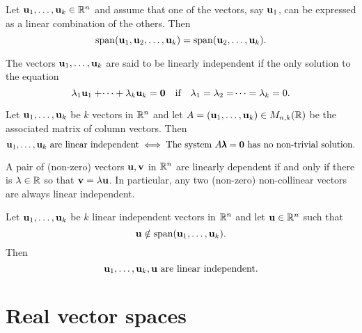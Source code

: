 \documentclass[10pt, a4paper]{article}
\begin{document}
\begin{lemma}
    Let $\mathbf{u}_1, \dotsc, \mathbf{u}_k \in \mathbb{R} ^ n$ and assume that one of the vectors,
    say $\mathbf{u}_1$,
    can be expressed as a linear combination of the others.
    Then
    \[
    \mathrm{span}(\mathbf{u}_1, \mathbf{u}_2, \dotsc, \mathbf{u}_k) = \mathrm{span}(\mathbf{u}_2, \dotsc, \mathbf{u}_k).
    \]
\end{lemma}

\begin{definition}
    The vectors $\mathbf{u}_1, \dotsc, \mathbf{u}_k$ are said to be linearly independent if the only solution to the equation
    \[
    \lambda_1\mathbf{u}_1 + \dotsi + \lambda_k\mathbf{u}_k = \mathbf{0}\quad\text{if}\quad\lambda_1 = \lambda_2 = \dotsi = \lambda_k = 0.
    \]
\end{definition}

\begin{corollary}
    Let $\mathbf{u}_1, \dotsc, \mathbf{u}_k$ be $k$ vectors in $\mathbb{R} ^ n$ and let $A = (\mathbf{u}_1, \dotsc, \mathbf{u}_k) \in M_{n, k}(\mathbb{R})$ be the associated matrix of column vectors.
    Then
    {
    \small
    \[
    \mathbf{u}_1, \dotsc, \mathbf{u}_k\text{ are linear independent} \iff \text{The system } A\pmb{\lambda} = \mathbf{0}\text{ has no non-trivial solution}.
    \]
    }
\end{corollary}

\begin{lemma}
    A pair of (non-zero) vectors $\mathbf{u}, \mathbf{v}$ in $\mathbb{R} ^ n$ are linearly dependent if and only if there is $\lambda \in \mathbb{R}$ so that $\mathbf{v} = \lambda\mathbf{u}$.
    In particular,
    any two (non-zero) non-collinear vectors are always linear independent.
\end{lemma}

\begin{proposition}
    Let $\mathbf{u}_1, \dotsc, \mathbf{u}_k$ be $k$ linear independent vectors in $\mathbb{R} ^ n$ and let $\mathbf{u} \in \mathbb{R} ^ n$ such that
    \[
    \mathbf{u} \notin \mathrm{span}(\mathbf{u}_1, \dotsc, \mathbf{u}_k).
    \]
    Then
    \[
    \mathbf{u}_1, \dotsc, \mathbf{u}_k, \mathbf{u}\text{ are linear independent}.
    \]
\end{proposition}

\newpage

\section{Real vector spaces}
\end{document}
